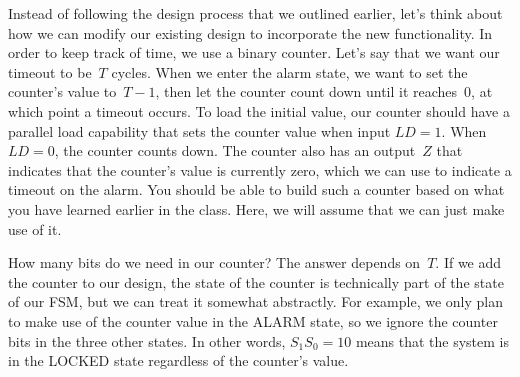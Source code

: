 Instead of following the design process that we outlined earlier, let's
think about how we can modify our existing design to incorporate the new
functionality.  In order to keep track of time, we use a binary counter.
%
Let's say that we want our timeout to be~$T$ cycles.
%
When we enter the alarm state, we want to set the counter's value 
to~$T-1$, then let the counter count down until it reaches~0, at 
which point a timeout occurs.
%
To load the initial value, our counter should have a parallel load 
capability that sets the counter value when input $LD=1$.  When $LD=0$,
the counter counts down. 
%
The counter also has an output~$Z$ that indicates that the counter's 
value is currently zero, which we can use to indicate a timeout on
the alarm.
%
You should be able to build such a counter based on what you have learned
earlier in the class.  Here, we will assume that we can just make use of
it.

How many bits do we need in our counter?  The answer depends on~$T$.
If we add the counter to our design, the state of the counter is 
technically part of the state of our FSM, but we can treat it
somewhat abstractly.  For example, we only plan to make use of the 
counter value in the ALARM state, so we ignore the counter bits in the
three other states.  In other words, $S_1S_0=10$ means that the system 
is in the LOCKED state regardless of the counter's value.

